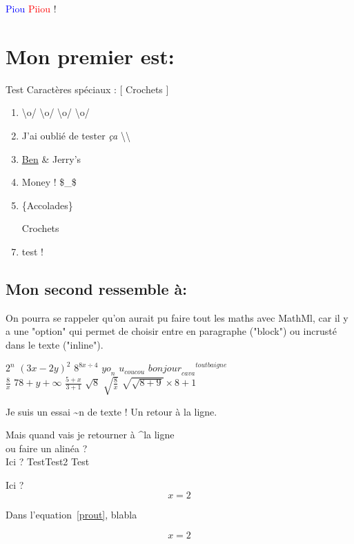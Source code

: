 \documentclass[10pt,a4paper]{report}
\begin{document}
\textcolor{blue}{Piou} \textcolor{red}{Piiou} !

\section{Mon premier est:}        

Test Caractères spéciaux : [ Crochets ]
\begin{enumerate}
\item \textbackslash o/ \textbackslash o/ \textbackslash o/ \textbackslash o/
\item J'ai oublié de tester \textit{ça} \textbackslash\textbackslash
\item \underline{Ben} \& Jerry's
\item Money ! \$\_\$
\item \{Accolades\}
\item [Crochets]
\item test !
\end{enumerate}

\subsection{Mon second ressemble à:}


On pourra se rappeler qu'on aurait pu faire tout les maths avec MathMl, car il y a une "option" qui permet de choisir entre en paragraphe ("block") ou incrusté dans le texte ("inline").

$ 2^n $
$ (3x - 2y)^2 $
$ 8^{8x \div 4} $
$ {yo}_n $
$ u_{coucou} $
$ {{bonjour}_{ca va}}^{tout baigne} $
\\
$ \frac{8}{x} $
$ 78+y+\infty $
$ \frac{5+x}{3+1} $
$ \sqrt{8}$
$ \sqrt{\frac{8}{x}}$
$ \sqrt{\sqrt{8+9}} \times 8 +1 $

Je suis un essai \textasciitilde n de texte !
Un retour à la ligne.




Mais quand vais je retourner à \textasciicircum la ligne\\ ou faire un alinéa ?\\
Ici ? Test\newline Test2
Test

Ici ?
\begin{equation}
\label{prout}
x = 2
\end{equation}

Dans l'equation~\eqref{prout}, blabla

\begin{equation*}
\label{eq:2}
x = 2
\end{equation*}
\end{document}
